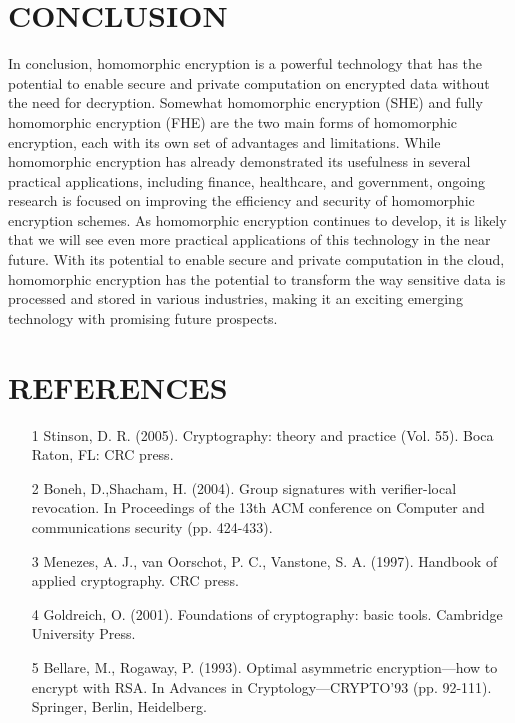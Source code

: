\documentclass[a4paper,11pt]{report}
\begin{document}
\chapter{CONCLUSION}
In conclusion, homomorphic encryption is a powerful technology that has the potential to enable secure and private computation on encrypted data without the need for decryption. Somewhat homomorphic encryption (SHE) and fully homomorphic encryption (FHE) are the two main forms of homomorphic encryption, each with its own set of advantages and limitations. While homomorphic encryption has already demonstrated its usefulness in several practical applications, including finance, healthcare, and government, ongoing research is focused on improving the efficiency and security of homomorphic encryption schemes. As homomorphic encryption continues to develop, it is likely that we will see even more practical applications of this technology in the near future. With its potential to enable secure and private computation in the cloud, homomorphic encryption has the potential to transform the way sensitive data is processed and stored in various industries, making it an exciting emerging technology with promising future prospects.
\chapter{REFERENCES}

\begin{itemize}
\item[1] Stinson, D. R. (2005). Cryptography: theory and practice (Vol. 55). Boca Raton, FL: CRC press.
\item[2] Boneh, D.,Shacham, H. (2004). Group signatures with verifier-local revocation. In Proceedings of the 13th ACM conference on Computer and communications security (pp. 424-433).
\item[3] Menezes, A. J., van Oorschot, P. C.,  Vanstone, S. A. (1997). Handbook of applied cryptography. CRC press.
\item[4] Goldreich, O. (2001). Foundations of cryptography: basic tools. Cambridge University Press.
\item[5] Bellare, M., Rogaway, P. (1993). Optimal asymmetric encryption—how to encrypt with RSA. In Advances in Cryptology—CRYPTO'93 (pp. 92-111). Springer, Berlin, Heidelberg.

\vspace{12pt}
\end{itemize}
\end{document}
